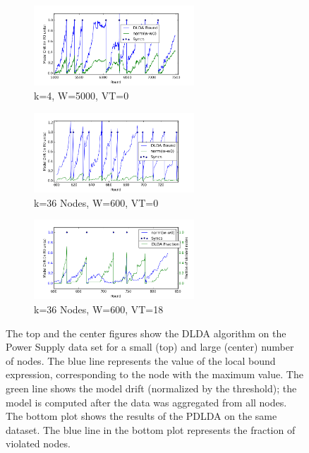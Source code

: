 \documentclass{sig-alternate-05-2015}
\begin{document}
\begin{figure}[ht!]
    \centering
    \begin{subfigure}[b]{0.5\textwidth}
        \includegraphics[width=\textwidth,height=3cm]{PowerSupply/4nodes.png}
        \caption{k=4, W=5000, VT=0}
        \label{fig:gull}
    \end{subfigure}

    \begin{subfigure}[b]{0.5\textwidth}
        \includegraphics[width=\textwidth,height=3cm]{PowerSupply/36nodes.png}
        \caption{k=36 Nodes, W=600, VT=0}
        \label{fig:tiger}
    \end{subfigure}

    \begin{subfigure}[b]{0.5\textwidth}
        \includegraphics[width=\textwidth,height=3cm]{PowerSupply/36nodesProb.png}
        \caption{k=36 Nodes, W=600, VT=18}
        \label{fig:mouse}
    \end{subfigure}
    \caption{The top and the center figures show the DLDA algorithm on the Power Supply data set for a small (top) and large (center) number of nodes. The blue line represents the value of the local bound expression, corresponding to the node with the maximum value. The green line shows the model drift (normalized by the threshold); the model is computed after the data was aggregated from all nodes. The bottom plot shows the results of the PDLDA on the same dataset. The blue line in the bottom plot represents the fraction of violated nodes.}\label{PowerSupplyFigures}
\end{figure}
\end{document}
